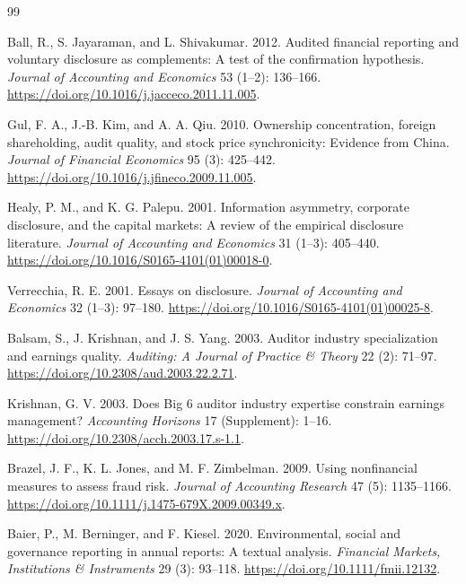 \documentclass[11pt]{article}
\begin{document}
\begin{thebibliography}{99}

Ball, R., S. Jayaraman, and L. Shivakumar. 2012.
Audited financial reporting and voluntary disclosure as complements: A test of the confirmation hypothesis.
\textit{Journal of Accounting and Economics} 53 (1--2): 136--166. \url{https://doi.org/10.1016/j.jacceco.2011.11.005}.

Gul, F. A., J.-B. Kim, and A. A. Qiu. 2010.
Ownership concentration, foreign shareholding, audit quality, and stock price synchronicity: Evidence from China.
\textit{Journal of Financial Economics} 95 (3): 425--442. \url{https://doi.org/10.1016/j.jfineco.2009.11.005}.

Healy, P. M., and K. G. Palepu. 2001.
Information asymmetry, corporate disclosure, and the capital markets: A review of the empirical disclosure literature.
\textit{Journal of Accounting and Economics} 31 (1--3): 405--440. \url{https://doi.org/10.1016/S0165-4101(01)00018-0}.

Verrecchia, R. E. 2001.
Essays on disclosure.
\textit{Journal of Accounting and Economics} 32 (1--3): 97--180. \url{https://doi.org/10.1016/S0165-4101(01)00025-8}.

Balsam, S., J. Krishnan, and J. S. Yang. 2003.
Auditor industry specialization and earnings quality.
\textit{Auditing: A Journal of Practice \& Theory} 22 (2): 71--97. \url{https://doi.org/10.2308/aud.2003.22.2.71}.

Krishnan, G. V. 2003.
Does Big 6 auditor industry expertise constrain earnings management?
\textit{Accounting Horizons} 17 (Supplement): 1--16. \url{https://doi.org/10.2308/acch.2003.17.s-1.1}.

Brazel, J. F., K. L. Jones, and M. F. Zimbelman. 2009.
Using nonfinancial measures to assess fraud risk.
\textit{Journal of Accounting Research} 47 (5): 1135--1166. \url{https://doi.org/10.1111/j.1475-679X.2009.00349.x}.

Baier, P., M. Berninger, and F. Kiesel. 2020.
Environmental, social and governance reporting in annual reports: A textual analysis.
\textit{Financial Markets, Institutions \& Instruments} 29 (3): 93--118. \url{https://doi.org/10.1111/fmii.12132}.


\end{thebibliography}
\end{document}
